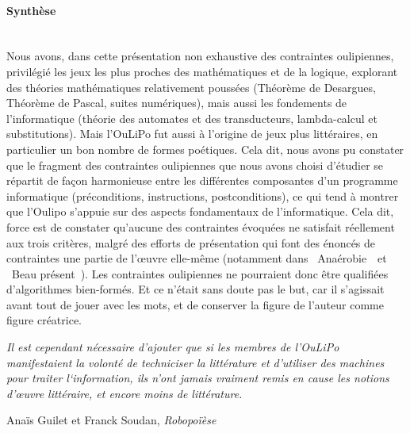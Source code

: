\documentclass{article}
\newcommand{\subsubsubsection}[1]{\paragraph{#1}\mbox{}\\}
\newenvironment{citationbox}
{\begin{center}
		\begin{minipage}{.8\textwidth}
		}
		{
		\end{minipage}	
\end{center}
}
\begin{document}
				
				
				\subsubsubsection{Synthèse}
					Nous avons, dans cette présentation non exhaustive des contraintes oulipiennes, privilégié les jeux les plus proches des mathématiques et de la logique, explorant des théories mathématiques relativement poussées (Théorème de Desargues, Théorème de Pascal, suites numériques), mais aussi les fondements de l'informatique (théorie des automates et des transducteurs, lambda-calcul et substitutions). Mais l'OuLiPo fut aussi à l'origine de jeux plus littéraires, en particulier un bon nombre de formes poétiques. Cela dit, nous avons pu constater que le fragment des contraintes oulipiennes que nous avons choisi d'étudier se répartit de façon harmonieuse entre les différentes composantes d'un programme informatique (préconditions, instructions, postconditions), ce qui tend à montrer que l'Oulipo s'appuie sur des aspects fondamentaux de l'informatique. Cela dit, force est de constater qu'aucune des contraintes évoquées ne satisfait réellement aux trois critères, malgré des efforts de présentation qui font des énoncés de contraintes une partie de l'œuvre elle-même (notamment dans \guillemotleft~Anaérobie~\guillemotright~et \guillemotleft~Beau présent~\guillemotright). Les contraintes oulipiennes ne pourraient donc être qualifiées d'algorithmes bien-formés. Et ce n'était sans doute pas le but, car il s'agissait avant tout de jouer avec les mots, et de conserver la figure de l'auteur comme figure créatrice.
				
					\begin{citationbox}
						\textit{Il est cependant nécessaire d'ajouter que si les membres de l'OuLiPo manifestaient la volonté de techniciser la littérature et d'utiliser des machines pour traiter l‘information, ils n'ont jamais vraiment remis en cause les notions d'œuvre littéraire, et encore moins de littérature.}
						\begin{flushright}
							Anaïs Guilet et Franck Soudan, \textit{Robopoïèse}\autocite{guilet2017}
						\end{flushright}
					\end{citationbox}
					
\end{document}
